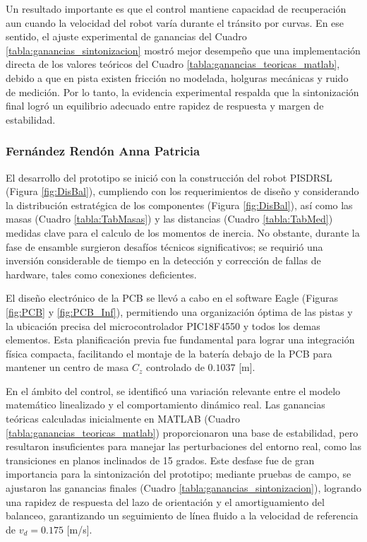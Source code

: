 \documentclass{article}
\begin{document}
Un resultado importante es que el control mantiene capacidad de recuperación aun cuando la velocidad del robot varía durante el tránsito por curvas. En ese sentido, el ajuste experimental de ganancias del Cuadro \ref{tabla:ganancias_sintonizacion} mostró mejor desempeño que una implementación directa de los valores teóricos del Cuadro \ref{tabla:ganancias_teoricas_matlab}, debido a que en pista existen fricción no modelada, holguras mecánicas y ruido de medición. Por lo tanto, la evidencia experimental respalda que la sintonización final logró un equilibrio adecuado entre rapidez de respuesta y margen de estabilidad.

\subsubsection{Fernández Rendón Anna Patricia}
El desarrollo del prototipo se inició con la construcción del robot PISDRSL (Figura \ref{fig:DisBal}), cumpliendo con los requerimientos 
de diseño y considerando la distribución estratégica de los componentes (Figura \ref{fig:DisBal}), así como las masas (Cuadro \ref{tabla:TabMasas}) y las distancias 
(Cuadro \ref{tabla:TabMed}) medidas clave para el calculo de los momentos de inercia. No obstante, durante la fase de ensamble surgieron desafíos técnicos significativos; 
se requirió una inversión considerable de tiempo en la detección y corrección de fallas de hardware, tales como conexiones deficientes.

El diseño electrónico de la PCB se llevó a cabo en el software Eagle (Figuras \ref{fig:PCB} y \ref{fig:PCB_Inf}), permitiendo una organización óptima de las pistas 
y la ubicación precisa del microcontrolador PIC18F4550 y todos los demas elementos. Esta planificación previa fue fundamental para lograr una integración física compacta, 
facilitando el montaje de la batería debajo de la PCB para mantener un centro de masa $C_z$ controlado de $0.1037$ [m].

En el ámbito del control, se identificó una variación relevante entre el modelo matemático linealizado y el comportamiento dinámico real. Las ganancias teóricas calculadas 
inicialmente en MATLAB (Cuadro \ref{tabla:ganancias_teoricas_matlab}) proporcionaron una base de estabilidad, pero resultaron insuficientes para manejar las perturbaciones del entorno 
real, como las transiciones en planos inclinados de 15 grados. Este desfase fue de gran importancia para la sintonización del prototipo; mediante pruebas de campo, se ajustaron las ganancias finales 
(Cuadro \ref{tabla:ganancias_sintonizacion}), logrando una rapidez de respuesta del lazo de orientación y el amortiguamiento del balanceo, garantizando un seguimiento de línea fluido a la velocidad de referencia de $v_d = 0.175$ [m/s].
\end{document}
